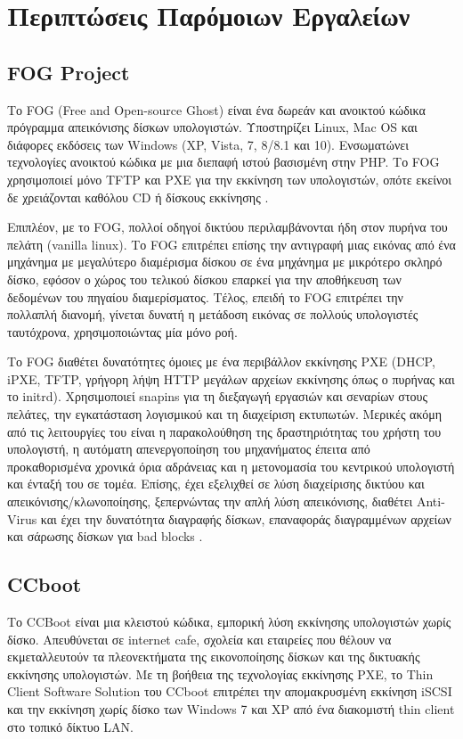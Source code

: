 \section{Περιπτώσεις Παρόμοιων Εργαλείων}
\subsection{FOG Project}
Το FOG (Free and Open-source Ghost) είναι ένα δωρεάν και ανοικτού κώδικα πρόγραμμα απεικόνισης δίσκων υπολογιστών. Υποστηρίζει Linux, Mac OS και διάφορες εκδόσεις των Windows (XP, Vista, 7, 8/8.1 και 10). Ενσωματώνει τεχνολογίες ανοικτού κώδικα με μια διεπαφή ιστού βασισμένη στην PHP. Το FOG χρησιμοποιεί μόνο TFTP και PXE για την εκκίνηση των υπολογιστών, οπότε εκείνοι δε χρειάζονται καθόλου CD ή δίσκους εκκίνησης \cite{FOG_Project_2020}.

Επιπλέον, με το FOG, πολλοί οδηγοί δικτύου περιλαμβάνονται ήδη στον πυρήνα του πελάτη (vanilla linux). Το FOG επιτρέπει επίσης την αντιγραφή μιας εικόνας από ένα μηχάνημα με μεγαλύτερο διαμέρισμα δίσκου σε ένα μηχάνημα με μικρότερο σκληρό δίσκο, εφόσον ο χώρος του τελικού δίσκου επαρκεί για την αποθήκευση των δεδομένων του πηγαίου διαμερίσματος. Τέλος, επειδή το FOG επιτρέπει την πολλαπλή διανομή, γίνεται δυνατή η μετάδοση εικόνας σε πολλούς υπολογιστές ταυτόχρονα, χρησιμοποιώντας μία μόνο ροή.

Το FOG  διαθέτει δυνατότητες όμοιες με ένα περιβάλλον εκκίνησης PXE (DHCP, iPXE, TFTP, γρήγορη λήψη HTTP μεγάλων αρχείων εκκίνησης όπως ο πυρήνας και το initrd). Χρησιμοποιεί snapins για τη διεξαγωγή εργασιών και σεναρίων στους πελάτες, την εγκατάσταση λογισμικού και τη διαχείριση εκτυπωτών. Μερικές ακόμη από τις λειτουργίες του είναι η παρακολούθηση της δραστηριότητας του χρήστη του υπολογιστή, η αυτόματη απενεργοποίηση του μηχανήματος έπειτα από προκαθορισμένα χρονικά όρια αδράνειας και η μετονομασία του κεντρικού υπολογιστή και ένταξή του σε τομέα. Επίσης, έχει εξελιχθεί σε λύση διαχείρισης δικτύου και απεικόνισης/κλωνοποίησης, ξεπερνώντας την απλή λύση απεικόνισης, διαθέτει Anti-Virus και έχει την δυνατότητα διαγραφής δίσκων, επαναφοράς διαγραμμένων αρχείων και σάρωσης δίσκων για bad blocks \cite{FOG_2020}.

\subsection{CCboot}
Το CCBoot είναι μια κλειστού κώδικα, εμπορική λύση εκκίνησης υπολογιστών χωρίς δίσκο. Aπευθύνεται σε internet cafe, σχολεία και εταιρείες που θέλουν να εκμεταλλευτούν τα πλεονεκτήματα της εικονοποίησης δίσκων και της δικτυακής εκκίνησης υπολογιστών. Με τη βοήθεια της τεχνολογίας εκκίνησης PXE, το Thin Client Software Solution του CCboot επιτρέπει την απομακρυσμένη εκκίνηση iSCSI και την εκκίνηση χωρίς δίσκο των Windows 7 και XP από ένα διακομιστή thin client στο τοπικό δίκτυο LAN.

